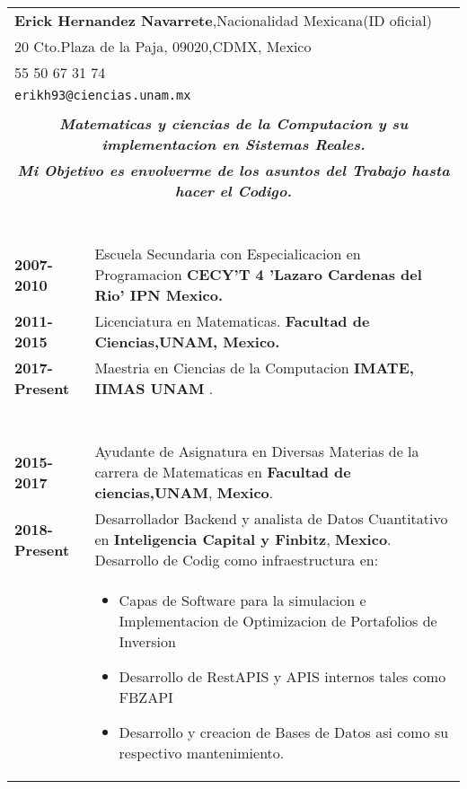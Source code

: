 \documentclass[twoside,a4paper,openright,10pt]{report}
\begin{document}
\begin{table}[ht]
\centering
\begin{tabular}{p{40mm} p{140mm}}

\multicolumn{2}{l}{\textbf{Erick Hernandez Navarrete},Nacionalidad Mexicana(ID oficial)}\\
\multicolumn{2}{l}{20 Cto.Plaza de la Paja, 09020,CDMX, Mexico}\\
\multicolumn{2}{l}{55 50 67 31 74}\\
\multicolumn{2}{l}{\texttt{erikh93@ciencias.unam.mx}}\\ \\
\multicolumn{2}{c}{\textbf{\textit{\large Matematicas y ciencias de la Computacion y su implementacion en Sistemas Reales.}}}\\
\multicolumn{2}{c}{\textbf{\textit{\large Mi Objetivo es envolverme de los asuntos del Trabajo hasta hacer el Codigo.}}}\\ \\

\multicolumn{2}{c}{\cellcolor{black} \textcolor{white}{Educacion}}\\ \\

 \textbf{2007-2010} & Escuela Secundaria con Especialicacion en Programacion
\textbf{CECY'T 4 'Lazaro Cardenas del Rio' IPN Mexico.}\\
 \textbf{2011-2015} & Licenciatura en Matematicas. \textbf{ Facultad de Ciencias,UNAM, Mexico.}\\
 \textbf{2017-Present} & Maestria en Ciencias de la Computacion
 \textbf{ IMATE, IIMAS UNAM} .\\
\\

\multicolumn{2}{c}{\cellcolor{black} \textcolor{white}{Experiencia Laboral}}\\ \\

\textbf{2015-2017} & Ayudante de Asignatura en Diversas Materias de la carrera de Matematicas en  \textbf{Facultad de ciencias,UNAM}, \textbf{Mexico}.\\

\textbf{2018-Present} & Desarrollador Backend y analista de Datos Cuantitativo en  \textbf{Inteligencia Capital y Finbitz}, \textbf{Mexico}. Desarrollo de Codig como infraestructura en:\\
& \vspace{-2mm} \begin{itemize}[noitemsep,nolistsep]
\item Capas de Software para la simulacion e Implementacion de Optimizacion de Portafolios de Inversion
\item Desarrollo de RestAPIS y APIS internos tales como FBZAPI
\item Desarrollo y creacion de Bases de Datos asi como su respectivo mantenimiento.
\vspace{-4mm}
\end{itemize}\\


\end{tabular}
\end{table}
\end{document}
